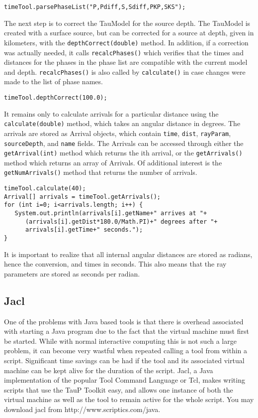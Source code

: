 \texttt{timeTool.parsePhaseList("P,Pdiff,S,Sdiff,PKP,SKS");}

The next step is to correct the TauModel for the source depth. 
The TauModel is created with a surface source, but can be corrected for 
a source at depth, given in kilometers, with the \texttt{depthCorrect(double)} 
method. In addition, 
if a correction was actually needed, it
calls \texttt{recalcPhases()} which verifies that the times and distances for 
the phases in the phase list are compatible with the current model and depth. 
\texttt{recalcPhases()} is also called
by \texttt{calculate()} in case changes were made to the list of phase names.

\texttt{timeTool.depthCorrect(100.0);}

It remains only to calculate arrivals for a particular distance using the 
\texttt{calculate(double)} method, which takes an angular distance in degrees.
The arrivals are stored as Arrival objects, which contain \texttt{time}, 
\texttt{dist}, \texttt{rayParam}, \texttt{sourceDepth}, and \texttt{name} 
fields. The Arrivals can be accessed through either the 
\texttt{getArrival(int)} method which returns the ith arrival, or 
the \texttt{getArrivals()} method which returns an array of Arrivals. 
Of additional interest is the \texttt{getNumArrivals()} method that returns 
the number of arrivals.

\begin{verbatim}
timeTool.calculate(40);
Arrival[] arrivals = timeTool.getArrivals();
for (int i=0; i<arrivals.length; i++) {
   System.out.println(arrivals[i].getName+" arrives at "+
      (arrivals[i].getDist*180.0/Math.PI)+" degrees after "+
      arrivals[i].getTime+" seconds.");
}
\end{verbatim}

It is important to realize that all internal angular distances are 
stored as radians, hence the conversion, and times in seconds. 
This also means that the 
ray parameters are stored as seconds per radian.



\subsection{Jacl}

One of the problems with Java based tools is that there is overhead associated
with starting a Java program due to the fact that the virtual machine must
first be started. While with normal interactive computing this is not such
a large problem, it can become very wastful when repeated calling a tool
from within a script. Significant time savings can be had if the tool
and its associated virtual machine can be kept alive for the duration
of the script.
Jacl, a Java implementation of the popular Tool Command Language or Tcl,
makes writing scripts that use the TauP Toolkit easy, and allows one
instance of both the
virtual machine as well as the tool to remain active for the whole script. 
You may download jacl from http://www.scriptics.com/java.

